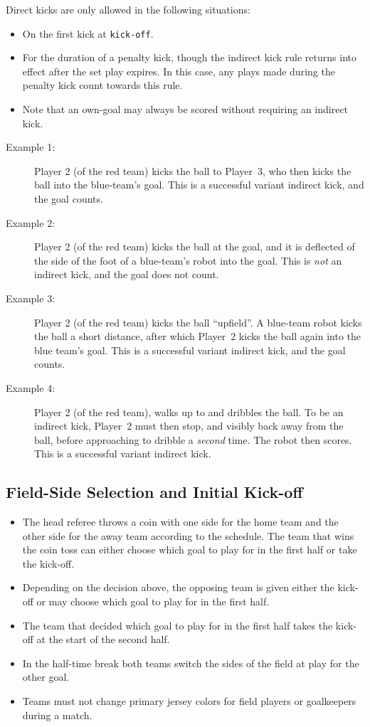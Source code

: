 Direct kicks are only allowed in the following situations:

\begin{itemize}
  \item On the first kick at \texttt{kick-off}.
  \item For the duration of a penalty kick, though the indirect kick rule returns into effect after the set play expires. In this case, any plays made during the penalty kick count towards this rule.
  \item Note that an own-goal may always be scored without requiring an indirect kick.
\end{itemize}

\begin{description}
  \item[Example 1:] Player 2 (of the red team) kicks the ball to Player~3, who then kicks the ball into the blue-team's goal.
    This is a successful variant indirect kick, and the goal counts.
  \item[Example 2:] Player 2 (of the red team) kicks the ball at the goal, and it is deflected of the side of the foot of a blue-team's robot into the goal.
    This is \textit{not} an indirect kick, and the goal does not count.
  \item[Example 3:] Player 2 (of the red team) kicks the ball ``upfield''.
    A blue-team robot kicks the ball a short distance, after which Player~2 kicks the ball again into the blue team's goal.
    This is a successful variant indirect kick, and the goal counts.
  \item[Example 4:] Player 2 (of the red team), walks up to and dribbles the ball.
    To be an indirect kick, Player~2 must then stop, and visibly back away from the ball, before approaching to dribble a \textit{second} time.
    The robot then scores.
    This is a successful variant indirect kick.
\end{description}

\subsection{Field-Side Selection and Initial Kick-off}
\label{sec:field_side_and_initial_kickoff}

\begin{itemize}
  \item The head referee throws a coin with one side for the home team and the other side for the away team according to the schedule.
    The team that wins the coin toss can either choose which goal to play for in the first half or take the kick-off.
  \item Depending on the decision above, the opposing team is given either the kick-off or may choose which goal to play for in the first half.
  \item The team that decided which goal to play for in the first half takes the kick-off at the start of the second half.
  \item In the half-time break both teams switch the sides of the field at play for the other goal.
  \item Teams must not change primary jersey colors for field players or goalkeepers during a match.
\end{itemize}

